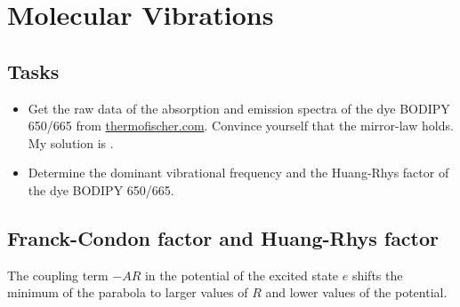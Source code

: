 \renewcommand{\chapterauthors}{Markus Lippitz}
\renewcommand{\lastmod}{March 15, 2024}


\chapter{Molecular Vibrations}



\section{Tasks}

\begin{itemize}
\item Get  the raw data of the absorption and emission spectra of the dye BODIPY 650/665 from \href{https://www.thermofisher.com/de/de/home/life-science/cell-analysis/labeling-chemistry/fluorescence-spectraviewer.html?SID=srch-svtool&UID=10001moh}{thermofischer.com}.
 Convince yourself that the mirror-law holds. My solution is .




\item Determine the dominant vibrational frequency and the Huang-Rhys factor of the dye BODIPY 650/665.

\end{itemize}



\section{Franck-Condon factor and Huang-Rhys factor}

\begin{marginfigure}
\caption{The coupling term $-A R$ in the potential of the excited state $e$ shifts the minimum of the parabola to larger values of $R$ and lower values of the potential. }
\end{marginfigure}



